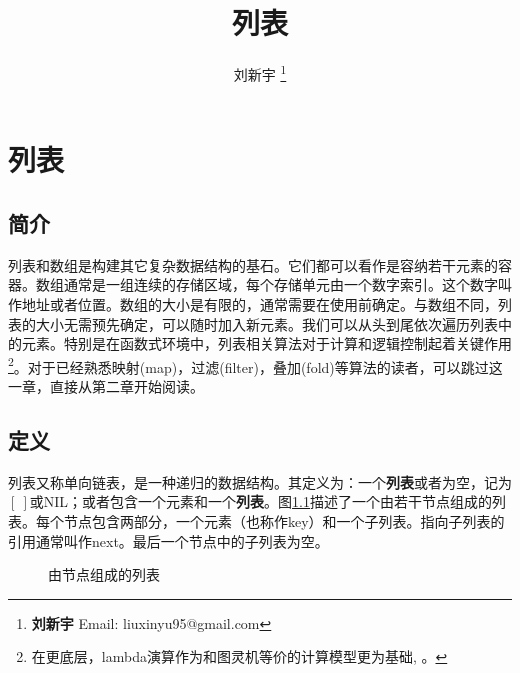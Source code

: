 \documentclass[b5paper]{ctexart}
\begin{document}
\title{列表}

\author{刘新宇
\thanks{{\bfseries 刘新宇} \newline
  Email: liuxinyu95@gmail.com \newline}
  }

\maketitle
\fi


\ifx\wholebook\relax
\chapter{列表}
\fi

\section{简介}
\label{introduction}

列表和数组是构建其它复杂数据结构的基石。它们都可以看作是容纳若干元素的容器。数组通常是一组连续的存储区域，每个存储单元由一个数字索引。这个数字叫作地址或者位置。数组的大小是有限的，通常需要在使用前确定。与数组不同，列表的大小无需预先确定，可以随时加入新元素。我们可以从头到尾依次遍历列表中的元素。特别是在函数式环境中，列表相关算法对于计算和逻辑控制起着关键作用\footnote{在更底层，lambda演算作为和图灵机等价的计算模型更为基础\cite{mittype}, \cite{unplugged}。}。对于已经熟悉映射(map)，过滤(filter)，叠加(fold)等算法的读者，可以跳过这一章，直接从第二章开始阅读。

\section{定义}

列表又称单向链表，是一种递归的数据结构。其定义为：一个\textbf{列表}或者为空，记为$[\ ]$或NIL；或者包含一个元素和一个\textbf{列表}。图\ref{fig:list-example}描述了一个由若干节点组成的列表。每个节点包含两部分，一个元素（也称作key）和一个子列表。指向子列表的引用通常叫作next。最后一个节点中的子列表为空。

\begin{figure}[htbp]
  \centering
  \caption{由节点组成的列表}
  \label{fig:list-example}
\end{figure}
\end{document}
